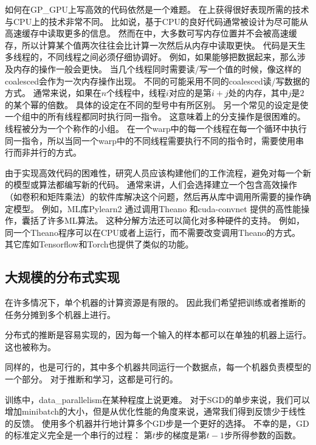 如何在\gls{GP_GPU}上写高效的代码依然是一个难题。
在上获得很好表现所需的技术与CPU上的技术非常不同。
比如说，基于CPU的良好代码通常被设计为尽可能从高速缓存中读取更多的信息。
然而在中，大多数可写内存位置并不会被高速缓存，所以计算某个值两次往往会比计算一次然后从内存中读取更快。
代码是天生多线程的，不同线程之间必须仔细协调好。
例如，如果能够把数据起来，那么涉及内存的操作一般会更快。
当几个线程同时需要读/写一个值的时候，像这样的\gls{coalesced}会作为一次内存操作出现。
不同的可能采用不同的\gls{coalesced}读/写数据的方式。
通常来说，如果在$n$个线程中，线程$i$对应的是第$i+j$处的内存，其中$j$是$2$的某个幂的倍数。
具体的设定在不同的型号中有所区别。
另一个常见的设定是使一个组中的所有线程都同时执行同一指令。
这意味着上的分支操作是很困难的。
线程被分为一个个称作的小组。
在一个\gls{warp}中的每一个线程在每一个循环中执行同一指令，所以当同一个\gls{warp}中的不同线程需要执行不同的指令时，需要使用串行而非并行的方式。


由于实现高效代码的困难性，研究人员应该构建他们的工作流程，避免对每一个新的模型或算法都编写新的代码。
通常来讲，人们会选择建立一个包含高效操作（如卷积和矩阵乘法）的软件库解决这个问题，然后再从库中调用所需要的操作确定模型。
例如，\gls{ML}库Pylearn2 \citep{pylearn2_arxiv_2013}通过调用Theano \citep{bergstra+al:2010-scipy-short,Bastien-2012}和cuda-convnet \citep{Krizhevsky2010tr}提供的高性能操作，囊括了许多\gls{ML}算法。
这种分解方法还可以简化对多种硬件的支持。
例如，同一个Theano程序可以在CPU或者上运行，而不需要改变调用Theano的方式。
其它库如Tensorflow\citep{tensorflow}和Torch\citep{Torch-2011}也提供了类似的功能。


\subsection{大规模的分布式实现}
\label{sec:large_scale_distributed_implementations}

在许多情况下，单个机器的计算资源是有限的。
因此我们希望把训练或者推断的任务分摊到多个机器上进行。

分布式的推断是容易实现的，因为每一个输入的样本都可以在单独的机器上运行。
这也被称为。

同样的，也是可行的，其中多个机器共同运行一个数据点，每一个机器负责模型的一个部分。
对于推断和学习，这都是可行的。


训练中，\gls{data_parallelism}在某种程度上说更难。
对于\gls{SGD}的单步来说，我们可以增加\gls{minibatch}的大小，但是从优化性能的角度来说，通常我们得到反馈少于线性的反馈。
使用多个机器并行地计算多个\gls{GD}步是一个更好的选择。
不幸的是，\gls{GD}的标准定义完全是一个串行的过程：
第$t$步的梯度是第$t-1$步所得参数的函数。


